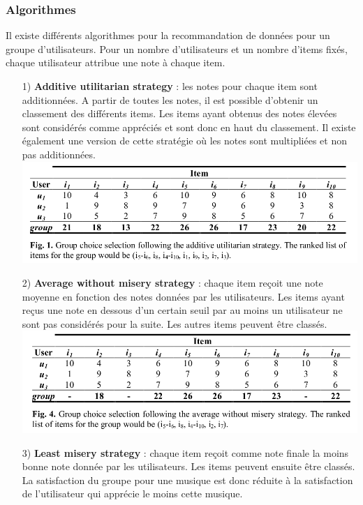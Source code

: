 \documentclass[12pt, openany]{report}
\begin{document}
\subsubsection{Algorithmes}

Il existe différents algorithmes pour la recommandation de données pour un groupe d'utilisateurs. Pour un nombre d'utilisateurs et un nombre d'items fixés, chaque utilisateur attribue une note à chaque item. \cite {Group}

\begin{itemize}
\item[1)] \textbf{Additive utilitarian strategy} : les notes pour chaque item sont additionnées. A partir de toutes les notes, il est possible d'obtenir un classement des différents items. Les items ayant obtenus des notes élevées sont considérés comme appréciés et sont donc en haut du classement. Il existe également une version de cette stratégie où les notes sont multipliées et non pas additionnées.
\\
\includegraphics[scale=0.4]{images/additive.png}
\item[2)] \textbf{Average without misery strategy} : chaque item reçoit une note moyenne en fonction des notes données par les utilisateurs. Les items ayant reçus une note en dessous d'un certain seuil par au moins un utilisateur ne sont pas considérés pour la suite. Les autres items peuvent être classés.
\\
\includegraphics[scale=0.4]{images/average_without_misery.png}
\item[3)] \textbf{Least misery strategy} : chaque item reçoit comme note finale la moins bonne note donnée par les utilisateurs. Les items peuvent ensuite être classés. La satisfaction du groupe pour une musique est donc réduite à la satisfaction de l'utilisateur qui apprécie le moins cette musique.

\end{itemize}
\end{document}
